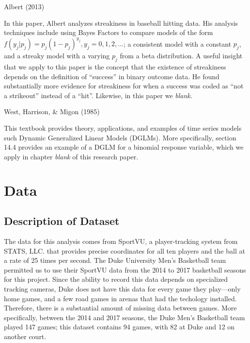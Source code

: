 \documentclass[12pt,twoside]{dukestatscithesis}
\theoremstyle{definition}
\theoremstyle{definition}
\theoremstyle{definition}
\theoremstyle{remark}
\begin{document}
Albert (2013)

In this paper, Albert analyzes streakiness in baseball hitting data. His
analysis techniques include using Bayes Factors to compare models of the
form \(f(y_j|p_j) = p_j(1-p_j)^{y_j}, y_j = 0,1,2,...\); a consistent
model with a constant \(p_j\), and a streaky model with a varying
\(p_j\) from a beta distribution. A useful insight that we apply to this
paper is the concept that the existence of streakiness depends on the
definition of ``success'' in binary outcome data. He found substantially
more evidence for streakiness for when a success was coded as ``not a
strikeout'' instead of a ``hit''. Likewise, in this paper we
\emph{blank}.

West, Harrison, \& Migon (1985)

This textbook provides theory, applications, and examples of time series
models such Dynamic Generalized Linear Models (DGLMs). More
specifically, section 14.4 provides an example of a DGLM for a binomial
response variable, which we apply in chapter \emph{blank} of this
research paper.

\chapter{Data}\label{data}

\section{Description of Dataset}\label{description-of-dataset}

The data for this analysis comes from SportVU, a player-tracking system
from STATS, LLC. that provides precise coordinates for all ten players
and the ball at a rate of 25 times per second. The Duke University Men's
Basketball team permitted us to use their SportVU data from the 2014 to
2017 basketball seasons for this project. Since the ability to record
this data depends on specialized tracking cameras, Duke does not have
this data for every game they play---only home games, and a few road
games in arenas that had the techology installed. Therefore, there is a
substantial amount of missing data between games. More specifically,
between the 2014 and 2017 seasons, the Duke Men's Basketball team played
147 games; this dataset contains 94 games, with 82 at Duke and 12 on
another court.
\end{document}
